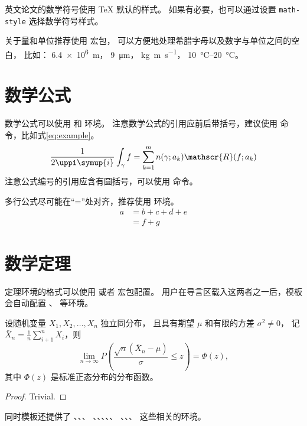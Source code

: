 英文论文的数学符号使用 \TeX{} 默认的样式。
如果有必要，也可以通过设置 \verb|math-style| 选择数学符号样式。

关于量和单位推荐使用
\href{http://mirrors.ctan.org/macros/latex/contrib/siunitx/siunitx.pdf}{}
宏包，
可以方便地处理希腊字母以及数字与单位之间的空白，
比如：
\SI{6.4e6}{m}，
\SI{9}{\micro\meter}，
\si{kg.m.s^{-1}}，
\SIrange{10}{20}{\degreeCelsius}。



\section{数学公式}

数学公式可以使用  和  环境。
注意数学公式的引用应前后带括号，建议使用  命令，比如式\eqref{eq:example}。
\begin{equation}
  \frac{1}{2 \uppi \symup{i}} \int_\gamma f = \sum_{k=1}^m n(\gamma; a_k) \mathscr{R}(f; a_k)
  \label{eq:example}
\end{equation}
注意公式编号的引用应含有圆括号，可以使用  命令。

多行公式尽可能在“=”处对齐，推荐使用  环境。
\begin{align}
  a & = b + c + d + e \\
    & = f + g
\end{align}



\section{数学定理}

定理环境的格式可以使用  或者  宏包配置。
用户在导言区载入这两者之一后，模板会自动配置 、 等环境。

\begin{theorem}
  设随机变量 $X_1, X_2, \dots, X_n$ 独立同分布， 且具有期望 $\mu$ 和有限的方差 $\sigma^2 \ne 0$，
  记 $\bar{X}_n = \frac{1}{n} \sum_{i+1}^n X_i$，则
  \begin{equation}
    \lim_{n \to \infty} P \left(\frac{\sqrt{n} \left( \bar{X}_n - \mu \right)}{\sigma} \le z \right) = \Phi(z),
  \end{equation}
  其中 $\Phi(z)$ 是标准正态分布的分布函数。
\end{theorem}
\begin{proof}
  Trivial.
\end{proof}

同时模板还提供了 、、、
、、、、、
、、、 这些相关的环境。
\fi